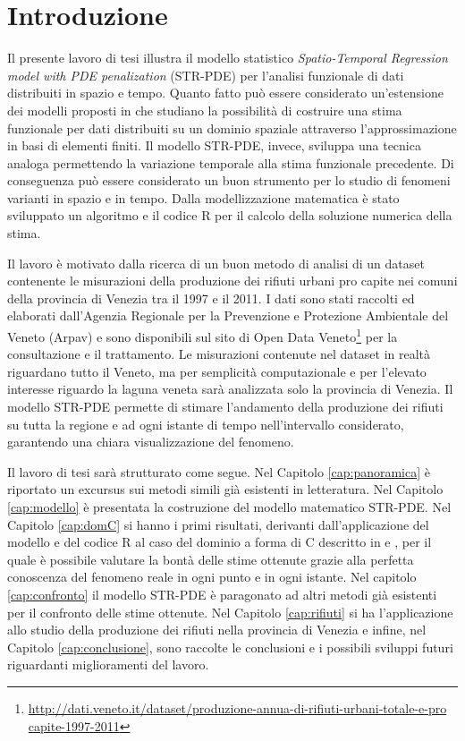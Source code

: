 \documentclass[a4paper,11pt,twoside,openright]{book}							%
\begin{document}
\chapter*{Introduzione}
\label{Cap:intro}
\thispagestyle{empty}
Il presente lavoro di tesi illustra il modello statistico \textit{Spatio-Temporal Regression model with PDE penalization} (STR-PDE) per l'analisi funzionale di dati distribuiti in spazio e tempo. Quanto fatto può essere considerato un'estensione dei modelli proposti in \cite{art:sangalli} che studiano la possibilità di costruire una stima funzionale per dati distribuiti su un dominio spaziale attraverso l'approssimazione in basi di elementi finiti. Il modello STR-PDE, invece, sviluppa una tecnica analoga permettendo la variazione temporale alla stima funzionale precedente. Di conseguenza può essere considerato un buon strumento per lo studio di fenomeni varianti in spazio e in tempo. Dalla modellizzazione matematica è stato sviluppato un algoritmo e il codice R per il calcolo della soluzione numerica della stima.

Il lavoro è motivato dalla ricerca di un buon metodo di analisi di un dataset contenente le misurazioni della produzione dei rifiuti urbani pro capite nei comuni della provincia di Venezia tra il 1997 e il 2011. I dati sono stati raccolti ed elaborati dall'Agenzia Regionale per la Prevenzione e Protezione Ambientale del Veneto (Arpav) e sono disponibili sul sito di Open Data Veneto\footnote{\href{http://dati.veneto.it/dataset/produzione-annua-di-rifiuti-urbani-totale-e-pro capite-1997-2011}{http://dati.veneto.it/dataset/produzione-annua-di-rifiuti-urbani-totale-e-pro capite-1997-2011}} per la consultazione e il trattamento. Le misurazioni contenute nel dataset in realtà riguardano tutto il Veneto, ma per semplicità computazionale e per l'elevato interesse riguardo la laguna veneta sarà analizzata solo la provincia di Venezia. Il modello STR-PDE permette di stimare l'andamento della produzione dei rifiuti su tutta la regione e ad ogni istante di tempo nell'intervallo considerato, garantendo una chiara visualizzazione del fenomeno.

Il lavoro di tesi sarà strutturato come segue. Nel Capitolo \ref{cap:panoramica} è riportato un excursus sui metodi simili già esistenti in letteratura. Nel Capitolo \ref{cap:modello} è presentata la costruzione del modello matematico STR-PDE. Nel Capitolo \ref{cap:domC} si hanno i primi risultati, derivanti dall'applicazione del modello e del codice R al caso del dominio a forma di C descritto in \cite{art:ramsay} e \cite{art:wood}, per il quale è possibile valutare la bontà delle stime ottenute grazie alla perfetta conoscenza del fenomeno reale in ogni punto e in ogni istante. Nel capitolo \ref{cap:confronto} il modello STR-PDE è paragonato ad altri metodi già esistenti per il confronto delle stime ottenute. Nel Capitolo \ref{cap:rifiuti} si ha l'applicazione allo studio della produzione dei rifiuti nella provincia di Venezia e infine, nel Capitolo \ref{cap:conclusione}, sono raccolte le conclusioni e i possibili sviluppi futuri riguardanti miglioramenti del lavoro.
\thispagestyle{empty}
\end{document}
